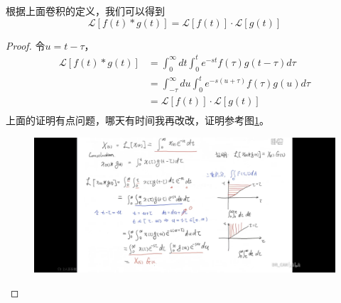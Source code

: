 \documentclass[lang=cn,10pt]{elegantbook}
\begin{document}
根据上面卷积的定义，我们可以得到
\begin{equation}
	\mathcal{L}\left[f\left(t\right)*g\left(t\right)\right]=
	\mathcal{L}\left[f\left(t\right)\right]\cdot\mathcal{L}\left[g\left(t\right)\right]
\end{equation}
\begin{proof}
	令$u = t - \tau$，
	\begin{equation*}
		\begin{aligned}
			\mathcal{L}\left[f\left(t\right)*g\left(t\right)\right] & = \int_{0}^{\infty} dt\int_{0}^{t}e^{-st}f(\tau)g(t-\tau)d\tau                         \\
			                                                        & = \int_{-\tau}^{\infty} du\int_{0}^{t}e^{-s(u+\tau)}f(\tau)g(u)d\tau                   \\
			                                                        & =  \mathcal{L}\left[f\left(t\right)\right]\cdot\mathcal{L}\left[g\left(t\right)\right] \\
		\end{aligned}
	\end{equation*}
	上面的证明有点问题，哪天有时间我再改改，证明参考图\ref{im3_3}。
	\begin{figure}[hp]
		\centering
		\includegraphics[width = 12cm]{img/im3_3.jpg}
		\caption{}
		\label{im3_3}
	\end{figure}
\end{proof}
\end{document}

